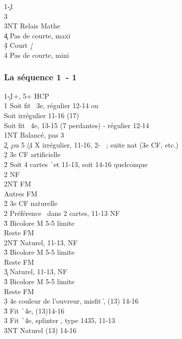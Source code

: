 \documentclass[a4paper]{article}
\begin{document}
\begin{bidtable}
1\c-1\h\\
3\s\+\\
3NT \> Relais Mathe\+\\
4\c \> Pas de courte, maxi\\
4\d\h \> Court \d /\h \\
4\s \> Pas de courte, mini\-\-
\end{bidtable}

\subsubsection{La séquence 1\pdfc\ - 1\pdfh}

\begin{bidtable}
1\c-1\h {}+\s , 5+ HCP\\
1\s \> Soit fit \s\ 3e, régulier 12-14 ou\+\\
Soit \> irrégulier 11-16 (17)\\
Soit \> fit \s\ 4e, 13-15 (7 perdantes) - régulier 12-14\-\\
1NT \> Balancé, pas 3\s \\
2\c {} \c\ ou 5 \c /4 X irrégulier, 11-16, 2- \s\ ; suite nat (3e CF, etc.)\+\\
2\d \> 3e CF artificielle\+\\
2\h \> Soit 4 cartes \h\ et 11-13, soit 14-16 quelconque\+\\
2\s \> NF\\
2NT \> FM\\
Autres \> FM\-\-\\
2\h \> 3e CF naturelle\+\\
2\s \> Préférence \s\ dans 2 cartes, 11-13 NF\+\\
3\h \> Bicolore M 5-5 limite\\
Reste \> FM\-\\
2NT \> Naturel, 11-13, NF\+\\
3\h \> Bicolore M 5-5 limite\\
Reste \> FM\-\\
3\c \> Naturel, 11-13, NF\+\\
3\h \> Bicolore M 5-5 limite\\
Reste \> FM\-\\
3\d \> 4e couleur de l'ouvreur, misfit \h , (13) 14-16\\
3\h \> Fit \h\ 4e, (13)14-16\\
3\s \> Fit \h\ 4e, splinter \s , type 1435, 11-13\\
3NT \> Naturel (13) 14-16\\

\end{bidtable}
\end{document}
